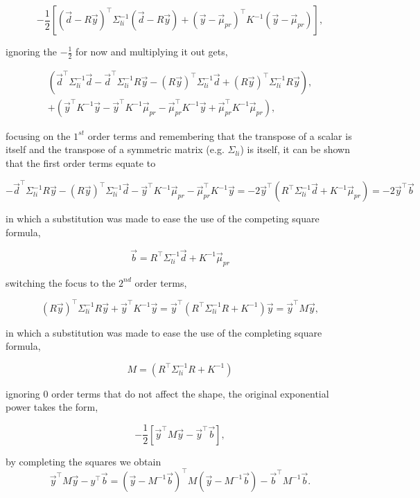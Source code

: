 $$
 -\frac{1}{2}\left[(\vec d - R\vec y)^{\top} \Sigma^{-1}_{li} (\vec d - R\vec y)  + (\vec y - \vec \mu_{pr})^{\top} K^{-1} (\vec y - \vec \mu_{pr})\right],
$$

\noindent ignoring the $-\frac{1}{2}$ for now and multiplying it out gets,

\begin{multline*}
\left(\vec d ^\top \Sigma_{li}^{-1} \vec d - \vec d^\top \Sigma_{li}^{-1} R\vec y - (R\vec y)^\top \Sigma_{li}^{-1} \vec d + (R\vec y)^\top \Sigma_{li}^{-1} R\vec y \right), \\ 
+ \left( \vec y^\top K^{-1} \vec y - \vec y^\top K^{-1} \vec \mu_{pr} - \vec \mu_{pr}^\top K^{-1} \vec y + \vec \mu_{pr}^\top K^{-1} \vec \mu_{pr} \right),
\end{multline*}

\noindent focusing on the $1^{st}$ order terms and remembering that the transpose of a scalar is itself and the transpose of a symmetric matrix (e.g. $\Sigma_{li}$) is itself, it can be shown that the first order terms equate to

$$
- \vec d^\top \Sigma_{li}^{-1} R\vec y - (R\vec y)^\top \Sigma_{li}^{-1} \vec d - \vec y^\top K^{-1} \vec \mu_{pr} - \vec \mu_{pr}^\top K^{-1} \vec y = -2 \vec y^\top ( R^{\top} \Sigma_{li}^{-1}\vec d + K^{-1} \vec \mu_{pr}) =-2 \vec y^\top \vec b
$$

\noindent in which a substitution was made to ease the use of the competing square formula, 

$$
\vec b = R^{\top} \Sigma_{li}^{-1}\vec d + K^{-1} \vec \mu_{pr}
$$

\noindent switching the focus to the $2^{nd}$ order terms,

$$
(R\vec y)^\top \Sigma_{li}^{-1} R\vec y + \vec y^\top K^{-1} \vec y = \vec y^\top (R^\top \Sigma_{li}^{-1} R + K^{-1}) \vec y = \vec y^\top M \vec y,
$$

\noindent in which a substitution was made to ease the use of the completing square formula,

$$
M = (R^\top \Sigma_{li}^{-1} R + K^{-1})
$$

\noindent ignoring 0 order terms that do not affect the shape, the original exponential power takes the form,

$$
 -\frac{1}{2}\left[\vec y^\top M \vec y - \vec y^\top \vec b \right],
$$

\noindent by completing the squares we obtain
$$
\vec y^\top M \vec y - y^\top \vec b = (\vec y - M^{-1}\vec b)^\top M (\vec y - M^{-1} \vec b) - \vec b^\top M^{-1} \vec b.
$$

